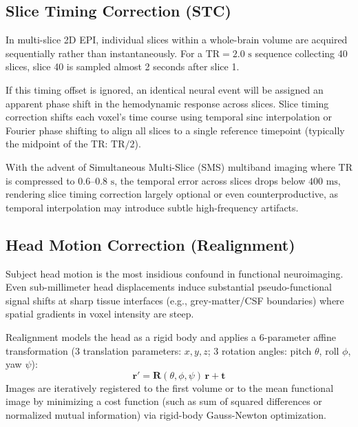 \documentclass[11pt,a4paper]{article}
\begin{document}
\subsection{Slice Timing Correction (STC)}
In multi-slice 2D EPI, individual slices within a whole-brain volume are acquired sequentially rather than instantaneously. For a $\text{TR} = 2.0\text{ s}$ sequence collecting 40 slices, slice 40 is sampled almost 2 seconds after slice 1. 

If this timing offset is ignored, an identical neural event will be assigned an apparent phase shift in the hemodynamic response across slices. Slice timing correction shifts each voxel's time course using temporal sinc interpolation or Fourier phase shifting to align all slices to a single reference timepoint (typically the midpoint of the TR: $\text{TR}/2$). 
\begin{qcbox}
With the advent of Simultaneous Multi-Slice (SMS) multiband imaging where TR is compressed to $0.6\text{--}0.8\text{ s}$, the temporal error across slices drops below $400\text{ ms}$, rendering slice timing correction largely optional or even counterproductive, as temporal interpolation may introduce subtle high-frequency artifacts.
\end{qcbox}

\subsection{Head Motion Correction (Realignment)}
Subject head motion is the most insidious confound in functional neuroimaging. Even sub-millimeter head displacements induce substantial pseudo-functional signal shifts at sharp tissue interfaces (e.g., grey-matter/CSF boundaries) where spatial gradients in voxel intensity are steep.

Realignment models the head as a rigid body and applies a 6-parameter affine transformation (3 translation parameters: $x, y, z$; 3 rotation angles: pitch $\theta$, roll $\phi$, yaw $\psi$):
\begin{equation}
    \mathbf{r}' = \mathbf{R}(\theta, \phi, \psi) \, \mathbf{r} + \mathbf{t}
\end{equation}
Images are iteratively registered to the first volume or to the mean functional image by minimizing a cost function (such as sum of squared differences or normalized mutual information) via rigid-body Gauss-Newton optimization.
\end{document}

